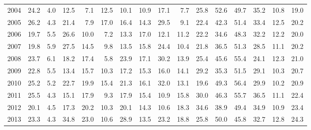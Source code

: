 \begin{tabular}{lrrrrrrrrrrrrrrr}
2004 &     24.2 &              4.0 &          12.5 &        7.1 &           12.5 &            10.1 &         10.9 &        17.1 &          7.7 &      25.8 &          52.6 &           49.7 &     35.2 &         10.8 &  19.0 \\
2005 &     26.2 &              4.3 &          21.4 &        7.9 &           17.0 &            16.4 &         14.3 &        29.5 &          9.1 &      22.4 &          42.3 &           51.4 &     33.4 &         12.5 &  20.2 \\
2006 &     19.7 &              5.5 &          26.6 &       10.0 &            7.2 &            13.3 &         17.0 &        12.1 &         11.2 &      22.2 &          34.6 &           48.3 &     32.2 &         12.2 &  20.0 \\
2007 &     19.8 &              5.9 &          27.5 &       14.5 &            9.8 &            13.5 &         15.8 &        24.4 &         10.4 &      21.8 &          36.5 &           51.3 &     28.5 &         11.1 &  20.2 \\
2008 &     23.7 &              6.1 &          18.2 &       17.4 &            5.8 &            23.9 &         17.1 &        30.2 &         13.9 &      25.4 &          45.6 &           55.4 &     24.1 &         12.3 &  21.0 \\
2009 &     22.8 &              5.5 &          13.4 &       15.7 &           10.3 &            17.2 &         15.3 &        16.0 &         14.1 &      29.2 &          35.3 &           51.5 &     29.1 &         10.3 &  20.7 \\
2010 &     25.2 &              5.2 &          22.7 &       19.9 &           15.4 &            21.3 &         16.1 &        32.0 &         13.1 &      19.6 &          49.3 &           56.4 &     29.9 &         10.2 &  20.9 \\
2011 &     25.5 &              4.3 &          15.1 &       17.9 &            9.3 &            17.9 &         15.4 &        10.9 &         15.8 &      30.0 &          46.3 &           55.7 &     36.5 &         11.1 &  22.4 \\
2012 &     20.1 &              4.5 &          17.3 &       20.2 &           10.3 &            20.1 &         14.3 &        10.6 &         18.3 &      34.6 &          38.9 &           49.4 &     34.9 &         10.9 &  23.4 \\
2013 &     23.3 &              4.3 &          34.8 &       23.0 &           10.6 &            28.9 &         13.5 &        23.2 &         18.8 &      25.8 &          50.0 &           45.8 &     32.7 &         12.8 &  24.3 \\

\end{tabular}
